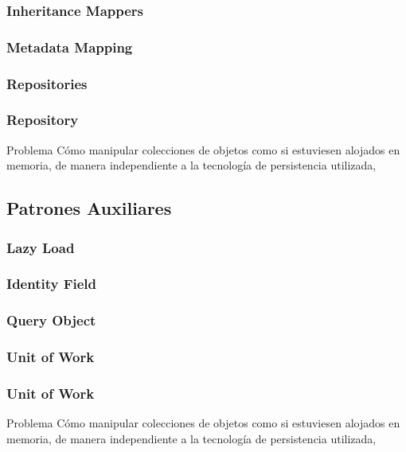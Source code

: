 \documentclass[a4paper,slidestop,xcolor=pst,blue]{beamer}
\begin{document}
\subsubsection{Inheritance Mappers}

\subsubsection{Metadata Mapping}

\subsubsection{Repositories}

\begin{frame}[c]
    \frametitle{Repository}
    \begin{block}{Problema}
        Cómo manipular colecciones de objetos como si estuviesen alojados en memoria, de manera independiente a la tecnología de persistencia utilizada,
    \end{block}
\end{frame}


\subsection{Patrones Auxiliares}

\subsubsection{Lazy Load}

\subsubsection{Identity Field}

\subsubsection{Query Object}

\subsubsection{Unit of Work}

\begin{frame}[c]
    \frametitle{Unit of Work}
    \begin{block}{Problema}
        Cómo manipular colecciones de objetos como si estuviesen alojados en memoria, de manera independiente a la tecnología de persistencia utilizada,
    \end{block}
\end{frame}
\end{document}
